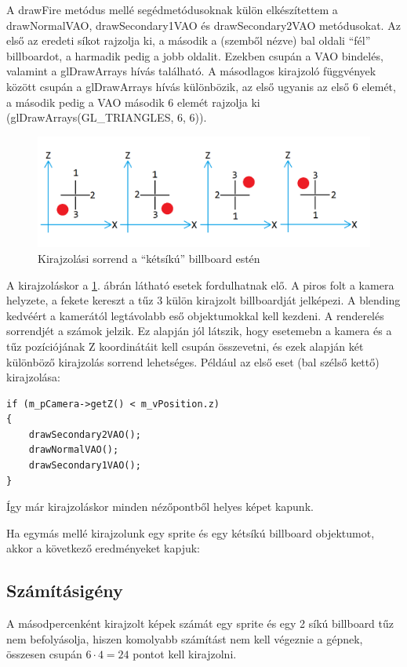 A drawFire metódus mellé segédmetódusoknak külön elkészítettem a drawNormalVAO, drawSecondary1VAO és drawSecondary2VAO metódusokat. Az első az eredeti síkot rajzolja ki, a második a (szemből nézve) bal oldali ``fél'' billboardot, a harmadik pedig a jobb oldalit. Ezekben csupán a VAO bindelés, valamint a glDrawArrays hívás található. A másodlagos kirajzoló függvények között csupán a glDrawArrays hívás különbözik, az első ugyanis az első 6 elemét, a második pedig a VAO második 6 elemét rajzolja ki (glDrawArrays(GL\_TRIANGLES, 6, 6)). 

\begin{figure}[h]
 \centering
 \includegraphics[width=\textwidth]{kepek/billboardSorting.png}
 \caption{Kirajzolási sorrend a ``kétsíkú'' billboard estén}
 \label{fig:billboardSorting}
\end{figure}
A kirajzoláskor a \ref{fig:billboardSorting}. ábrán látható esetek fordulhatnak elő. A piros folt a kamera helyzete, a fekete kereszt a tűz 3 külön kirajzolt billboardját jelképezi. A blending kedvéért a kamerától legtávolabb eső objektumokkal kell kezdeni. A renderelés sorrendjét a számok jelzik. Ez alapján jól látszik, hogy esetemebn a kamera és a tűz pozíciójának Z koordinátáit kell csupán összevetni, és ezek alapján két különböző kirajzolás sorrend lehetséges. 
Például az első eset (bal szélső kettő) kirajzolása: 
\begin{lstlisting}
if (m_pCamera->getZ() < m_vPosition.z)
{
	drawSecondary2VAO();
	drawNormalVAO();
	drawSecondary1VAO();
}
\end{lstlisting}
Így már kirajzoláskor minden nézőpontből helyes képet kapunk.

Ha egymás mellé kirajzolunk egy sprite és egy kétsíkú billboard objektumot, akkor a következő eredményeket kapjuk: 

\subsection{Számításigény}
A másodpercenként kirajzolt képek számát egy sprite és egy 2 síkú billboard tűz nem befolyásolja, hiszen komolyabb számítást nem kell végeznie a gépnek, összesen csupán $6 \cdot 4 = 24$ pontot kell kirajzolni.


